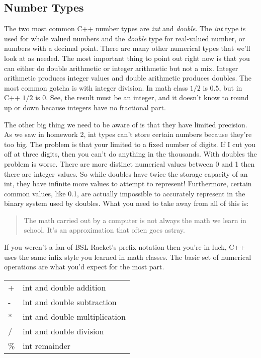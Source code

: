 \documentclass[]{tufte-handout}
\begin{document}
\subsection{Number Types}

The two most common C++ number types are \textit{int} and \textit{double}. The \textit{int} type is used for whole valued numbers and the \textit{double} type for real-valued number, or numbers with a decimal point. There are many other numerical types that we'll look at as needed. The most important thing to point out right now is that you can either do double arithmetic or integer arithmetic but not a mix.  Integer arithmetic produces integer values and double arithmetic produces doubles. The most common gotcha is with integer division.  In math class $1/2$ is $0.5$, but in C++ $1/2$ is $0$.  See, the result must be an integer, and it doesn't know to round up or down because integers have no fractional part.  

The other big thing we need to be aware of is that they have limited precision. As we saw in homework 2, int types can't store certain numbers because they're too big.  The problem is that your limited to a fixed number of digits. If I cut you off at three digits, then you can't do anything in the thousands.  With doubles the problem is worse. There are more distinct numerical values between 0 and 1 then there are integer values. So while doubles have twice the storage capacity of an int, they have infinite more values to attempt to represent! Furthermore, certain common values, like 0.1, are actually impossible to accurately represent in the binary system used by doubles.  What you need to take away from all of this is:

\begin{quote}
The math carried out by a computer is not always the math we learn in school. It's an approximation that often goes astray.
\end{quote}

If you weren't a fan of BSL Racket's prefix notation then you're in luck, C++ uses the same infix style you learned in math classes.  The basic set of numerical operations are what you'd expect for the most part.
\begin{center}
\begin{tabular}{ll}
+ & int and double addition \\
- & int and double subtraction \\
* & int and double multiplication \\
/ & int and double division \\
\% & int remainder
\end{tabular}
\end{center}
\end{document}
